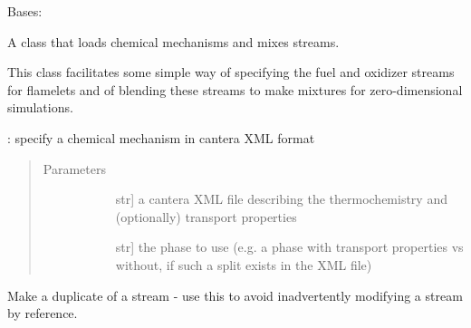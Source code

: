 \documentclass[letterpaper,10pt,english]{sphinxmanual}
\begin{document}
\begin{fulllineitems}
\label{\detokenize{spitfire.chemistry.mechanism:spitfire.chemistry.mechanism.ChemicalMechanismSpec}}
Bases: 

A class that loads chemical mechanisms and mixes streams.

This class facilitates some simple way of specifying the fuel and oxidizer streams for flamelets
and of blending these streams to make mixtures for zero-dimensional simulations.

: specify a chemical mechanism in cantera XML format
\begin{quote}\begin{description}
\item[{Parameters}] \leavevmode\begin{description}
\item[{}] \leavevmode{[}str{]}
a cantera XML file describing the thermochemistry and (optionally) transport properties

\item[{}] \leavevmode{[}str{]}
the phase to use (e.g. a phase with transport properties vs without, if such a split exists in the XML file)

\end{description}

\end{description}\end{quote}

\begin{fulllineitems}
\label{\detokenize{spitfire.chemistry.mechanism:spitfire.chemistry.mechanism.ChemicalMechanismSpec.copy_stream}}
Make a duplicate of a stream - use this to avoid inadvertently modifying a stream by reference.

\end{fulllineitems}



\end{fulllineitems}
\end{document}
